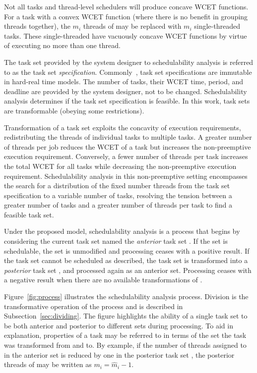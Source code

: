 \documentclass[a4paper,UKenglish,cleveref,autoref,english]{lipics-v2019}
\begin{document}
Not all tasks and thread-level schedulers will produce concave WCET
functions. For a task  with a convex WCET function (where
there is no benefit in grouping threads together), the
${m_i}$ threads of  may be replaced with ${m_i}$
single-threaded tasks. These single-threaded have vacuously concave
WCET functions by virtue of executing no more than one thread.

The task set \tasks{} provided by the system designer to
schedulability analysis is referred to as the task set
\emph{specification}. Commonly~\cite{Baruah:1990,Liu:1973,Baruah:2005,Bertogna:2011,Burns:1995,Buttazzo:2011}, task set specifications are immutable
in hard-real time models. The number of tasks, their
WCET time, period, and deadline are provided by the system
designer, not to be changed. Schedulability analysis determines if
the task set specification is feasible. In this work, task sets are
transformable (obeying some restrictions).

Transformation of a task set exploits the concavity of execution
requirements, redistributing the threads of individual tasks to
multiple tasks. A greater number of threads per job reduces the WCET
of a task but increases the non-preemptive execution
requirement. Conversely, a fewer number of threads per task increases
the total WCET for all tasks while decreasing the non-preemptive
execution requirement. Schedulability analysis in this non-preemptive
setting  encompasses the search for a distribution of the fixed number
threads from the task set specification to a variable number of tasks,
resolving the tension between a greater number of tasks and a
greater number of threads per task to find a feasible task set. 
 
Under the proposed model, schedulability analysis is a process that
begins by considering the current task set named the \emph{anterior}
task set \supts{}. If the set is schedulable, the set is unmodified and
processing ceases with a positive result. If the task set \supts{}
cannot be scheduled as described, the task set is transformed into a
\emph{posterior} task set \tasks{}, and processed again as an anterior
set. Processing ceases with a negative result when there are no
available transformations of \supts{}.

Figure~\ref{fig:process} illustrates the schedulability analysis
process. Division is the transformative operation of the process and
is described in Subsection~\ref{sec:dividing}. The figure highlights the
ability of a single task set to be both anterior and posterior to
different sets during processing. To aid in explanation, properties of a
task may be referred to in terms of the set the task was transformed
from and to. By example, if the number of threads assigned to 
in the anterior set \supts{} is reduced by one in the posterior task
set \tasks{}, the posterior threads of  may be written as
${m_i = \hat{m}_i - 1}$.
\end{document}
